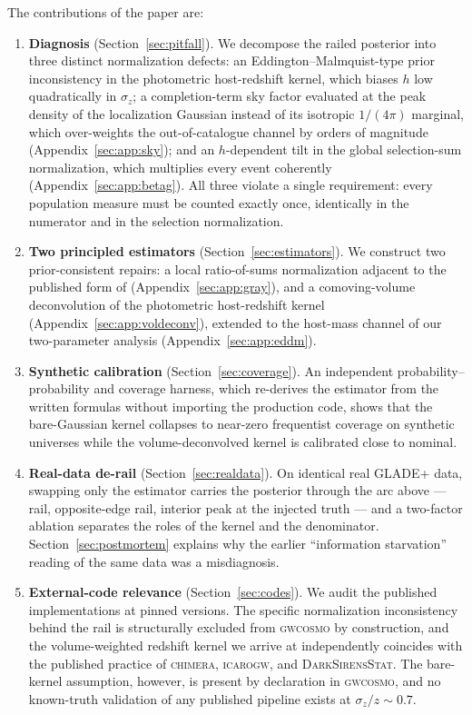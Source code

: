 The contributions of the paper are:
\begin{enumerate}
  \item \textbf{Diagnosis} (Section~\ref{sec:pitfall}).  We decompose
    the railed posterior into three distinct normalization defects:
    an Eddington--Malmquist-type prior inconsistency in the
    photometric host-redshift kernel, which biases $h$ low
    quadratically in $\sigma_z$; a completion-term sky factor
    evaluated at the peak density of the localization Gaussian
    instead of its isotropic $1/(4\pi)$ marginal, which over-weights
    the out-of-catalogue channel by orders of magnitude
    (Appendix~\ref{sec:app:sky}); and an $h$-dependent tilt in the
    global selection-sum normalization, which multiplies every event
    coherently (Appendix~\ref{sec:app:betag}).  All three violate a
    single requirement: every population measure must be counted
    exactly once, identically in the numerator and in the selection
    normalization.
  \item \textbf{Two principled estimators}
    (Section~\ref{sec:estimators}).  We construct two prior-consistent
    repairs: a local ratio-of-sums normalization adjacent to the
    published form of \citet{Gray:2019ksv}
    (Appendix~\ref{sec:app:gray}), and a comoving-volume
    deconvolution of the photometric host-redshift kernel
    (Appendix~\ref{sec:app:voldeconv}), extended to the host-mass
    channel of our two-parameter analysis
    (Appendix~\ref{sec:app:eddm}).
  \item \textbf{Synthetic calibration} (Section~\ref{sec:coverage}).
    An independent probability--probability and coverage harness,
    which re-derives the estimator from the written formulas without
    importing the production code, shows that the bare-Gaussian
    kernel collapses to near-zero frequentist coverage on synthetic
    universes while the volume-deconvolved kernel is calibrated close
    to nominal.
  \item \textbf{Real-data de-rail} (Section~\ref{sec:realdata}).  On
    identical real GLADE+ data, swapping only the estimator carries
    the posterior through the arc above --- rail, opposite-edge rail,
    interior peak at the injected truth --- and a two-factor ablation
    separates the roles of the kernel and the denominator.
    Section~\ref{sec:postmortem} explains why the earlier
    ``information starvation'' reading of the same data was a
    misdiagnosis.
  \item \textbf{External-code relevance} (Section~\ref{sec:codes}).
    We audit the published implementations at pinned versions.  The
    specific normalization inconsistency behind the rail is
    structurally excluded from \textsc{gwcosmo} by construction, and
    the volume-weighted redshift kernel we arrive at independently
    coincides with the published practice of \textsc{chimera},
    \textsc{icarogw}, and \textsc{DarkSirensStat}.  The bare-kernel
    assumption, however, is present by declaration in
    \textsc{gwcosmo}, and no known-truth validation of any published
    pipeline exists at $\sigma_z/z \sim 0.7$.
\end{enumerate}

